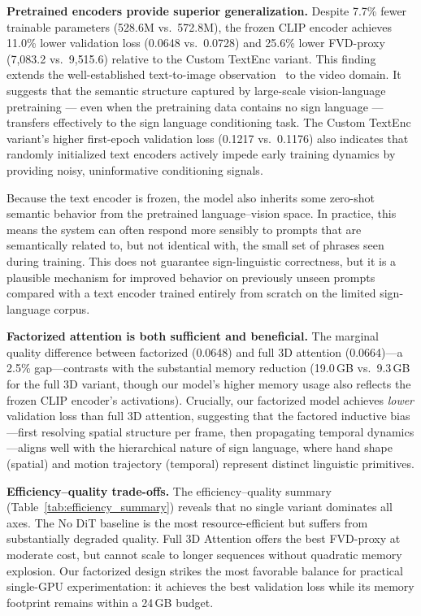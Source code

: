 \documentclass{ieeeaccess}
\begin{document}
\textbf{Pretrained encoders provide superior generalization.} Despite 7.7\% fewer trainable parameters (528.6M vs.\ 572.8M), the frozen CLIP encoder achieves 11.0\% lower validation loss (0.0648 vs.\ 0.0728) and 25.6\% lower FVD-proxy (7{,}083.2 vs.\ 9{,}515.6) relative to the Custom TextEnc variant. This finding extends the well-established text-to-image observation~\cite{rombach2022ldm} to the video domain. It suggests that the semantic structure captured by large-scale vision-language pretraining — even when the pretraining data contains no sign language — transfers effectively to the sign language conditioning task. The Custom TextEnc variant's higher first-epoch validation loss (0.1217 vs.\ 0.1176) also indicates that randomly initialized text encoders actively impede early training dynamics by providing noisy, uninformative conditioning signals.

{\color{blue}%
Because the text encoder is frozen, the model also inherits some zero-shot semantic behavior from the pretrained language--vision space. In practice, this means the system can often respond more sensibly to prompts that are semantically related to, but not identical with, the small set of phrases seen during training. This does not guarantee sign-linguistic correctness, but it is a plausible mechanism for improved behavior on previously unseen prompts compared with a text encoder trained entirely from scratch on the limited sign-language corpus.
}

\textbf{Factorized attention is both sufficient and beneficial.} The marginal quality difference between factorized (0.0648) and full 3D attention (0.0664)---a 2.5\% gap---contrasts with the substantial memory reduction (19.0\,GB vs.\ 9.3\,GB for the full 3D variant, though our model's higher memory usage also reflects the frozen CLIP encoder's activations). Crucially, our factorized model achieves \emph{lower} validation loss than full 3D attention, suggesting that the factored inductive bias---first resolving spatial structure per frame, then propagating temporal dynamics---aligns well with the hierarchical nature of sign language, where hand shape (spatial) and motion trajectory (temporal) represent distinct linguistic primitives.

\textbf{Efficiency--quality trade-offs.} The efficiency--quality summary (Table~\ref{tab:efficiency_summary}) reveals that no single variant dominates all axes. The No DiT baseline is the most resource-efficient but suffers from substantially degraded quality. Full 3D Attention offers the best FVD-proxy at moderate cost, but cannot scale to longer sequences without quadratic memory explosion. Our factorized design strikes the most favorable balance for practical single-GPU experimentation: it achieves the best validation loss while its memory footprint remains within a 24\,GB budget.
\end{document}
